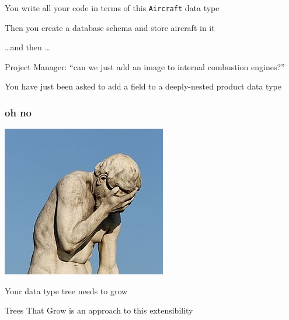 \begin{frame}
\begin{center}
You write all your code in terms of this \lstinline{Aircraft} data type
\end{center}
\end{frame}

\begin{frame}
\begin{center}
Then you create a database schema and store aircraft in it
\end{center}
\end{frame}

\begin{frame}
\begin{center}
\ldots and then \ldots
\end{center}
\end{frame}

\begin{frame}
\begin{center}
Project Manager: ``can we just add an image to internal combustion engines?''
\end{center}
\end{frame}

\begin{frame}
\begin{center}
You have just been asked to add a field to a deeply-nested product data type
\end{center}
\end{frame}

\begin{frame}[fragile]
\frametitle{oh no}
\begin{center}
\includegraphics[height=0.24\textheight]{image/ohno.jpg}
\end{center}
\end{frame}

\begin{frame}
\begin{center}
Your data type tree needs to grow
\end{center}
\end{frame}

\begin{frame}
\begin{center}
Trees That Grow is an approach to this extensibility
\end{center}
\end{frame}